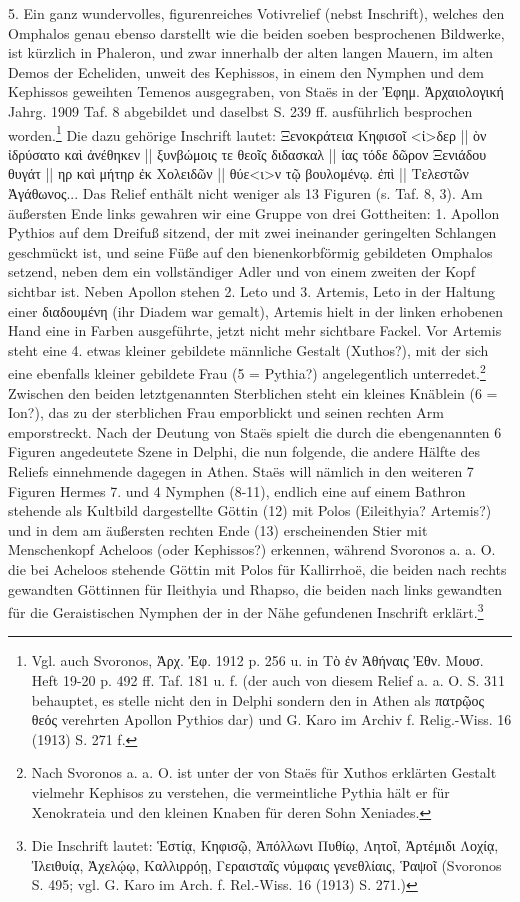 \documentclass[a4paper, 11pt, oneside]{article}
\begin{document}
5. Ein ganz wundervolles, figurenreiches Votivrelief (nebst Inschrift), welches den Omphalos genau ebenso darstellt wie die beiden soeben besprochenen Bildwerke, ist kürzlich in Phaleron, und zwar innerhalb der alten langen Mauern, im alten Demos der Echeliden, unweit des Kephissos, in einem den Nymphen und dem Kephissos geweihten Temenos ausgegraben, von Staës in der Ἐφημ. Ἀρχαιολογική Jahrg. 1909 Taf. 8 abgebildet und daselbst S. 239 ff. ausführlich besprochen worden.\footnote{Vgl. auch Svoronos, Ἀρχ. Ἐφ. 1912 p. 256 u. in Τὸ ἐν Ἀθήναις Ἐθν. Μουσ. Heft 19-20 p. 492 ff. Taf. 181 u. f. (der auch von diesem Relief a. a. O. S. 311 behauptet, es stelle nicht den in Delphi sondern den in Athen als πατρῷος θεός verehrten Apollon Pythios dar) und G. Karo im Archiv f. Relig.-Wiss. 16 (1913) S. 271 f.} Die dazu gehörige Inschrift lautet: Ξενοκράτεια Κηφισοῖ <ἰ>δερ || ὸν ἰδρύσατο καὶ ἀνέθηκεν || ξυνβώμοις τε θεοῖς διδασκαλ || ίας τόδε δῶρον Ξενιάδου θυγάτ || ηρ καὶ μήτηρ ἐκ Χολειδῶν || θύε<ι>ν τῷ βουλομένῳ. ἐπὶ || Τελεστῶν Ἀγάθωνος... Das Relief enthält nicht weniger als 13 Figuren (s. Taf. 8, 3). Am äußersten Ende links gewahren wir eine Gruppe von drei Gottheiten: 1. Apollon Pythios auf dem Dreifuß sitzend, der mit zwei ineinander geringelten Schlangen geschmückt ist, und seine Füße auf den bienenkorbförmig gebildeten Omphalos setzend, neben dem ein vollständiger Adler und von einem zweiten der Kopf sichtbar ist. Neben Apollon stehen 2. Leto und 3. Artemis, Leto in der Haltung einer διαδουμένη (ihr Diadem war gemalt), Artemis hielt in der linken erhobenen Hand eine in Farben ausgeführte, jetzt nicht mehr sichtbare Fackel. Vor Artemis steht eine 4. etwas kleiner gebildete männliche Gestalt (Xuthos?), mit der sich eine ebenfalls kleiner gebildete Frau (5 = Pythia?) angelegentlich unterredet.\footnote{Nach Svoronos a. a. O. ist unter der von Staës für Xuthos erklärten Gestalt vielmehr Kephisos zu verstehen, die vermeintliche Pythia hält er für Xenokrateia und den kleinen Knaben für deren Sohn Xeniades.} Zwischen den beiden letztgenannten Sterblichen steht ein kleines Knäblein (6 = Ion?), das zu der sterblichen Frau emporblickt und seinen rechten Arm emporstreckt. Nach der Deutung von Staës spielt die durch die ebengenannten 6 Figuren angedeutete Szene in Delphi, die nun folgende, die andere Hälfte des Reliefs einnehmende dagegen in Athen. Staës will nämlich in den weiteren 7 Figuren Hermes 7. und 4 Nymphen (8-11), endlich eine auf einem Bathron stehende als Kultbild dargestellte Göttin (12) mit Polos (Eileithyia? Artemis?) und in dem am äußersten rechten Ende (13) erscheinenden Stier mit Menschenkopf Acheloos (oder Kephissos?) erkennen, während Svoronos a. a. O. die bei Acheloos stehende Göttin mit Polos für Kallirrhoë, die beiden nach rechts gewandten Göttinnen für Ileithyia und Rhapso, die beiden nach links gewandten für die Geraistischen Nymphen der in der Nähe gefundenen Inschrift erklärt.\footnote{Die Inschrift lautet: Ἑστίᾳ, Κηφισῷ, Ἀπόλλωνι Πυθίῳ, Λητοῖ, Ἀρτέμιδι Λοχίᾳ, Ἰλειθυίᾳ, Ἀχελῴῳ, Καλλιρρόῃ, Γεραισταῖς νύμφαις γενεθλίαις, Ῥαψοῖ (Svoronos S. 495; vgl. G. Karo im Arch. f. Rel.-Wiss. 16 (1913) S. 271.)}
\end{document}
